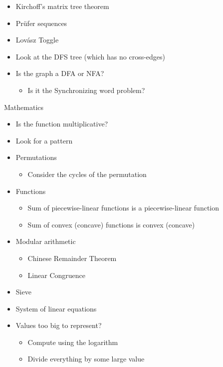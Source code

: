 \begin{myitemize}
\begin{itemize}
            \item Kirchoff's matrix tree theorem
            \item Pr\"ufer sequences
            \item Lov\'asz Toggle
            \item Look at the DFS tree (which has no cross-edges)
            \item Is the graph a DFA or NFA?
                \begin{itemize}
                  \item Is it the Synchronizing word problem?
                \end{itemize}
          \end{itemize}
        \item Mathematics
          \begin{itemize}
            \item Is the function multiplicative?
            \item Look for a pattern
            \item Permutations
              \begin{itemize}
                \item Consider the cycles of the permutation
              \end{itemize}
            \item Functions
              \begin{itemize}
                \item Sum of piecewise-linear functions is a piecewise-linear function
                \item Sum of convex (concave) functions is convex (concave)
              \end{itemize}
            \item Modular arithmetic
              \begin{itemize}
                \item Chinese Remainder Theorem
                \item Linear Congruence
              \end{itemize}
            \item Sieve
            \item System of linear equations
            \item Values too big to represent?
              \begin{itemize}
                \item Compute using the logarithm
                \item Divide everything by some large value

\end{itemize}
\end{itemize}
\end{myitemize}
